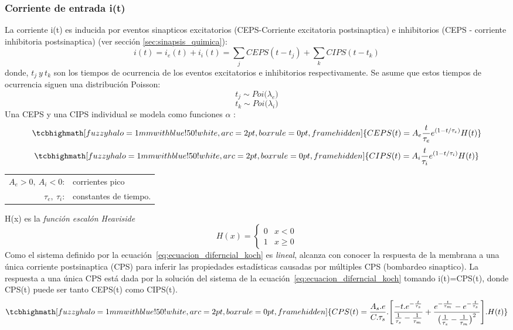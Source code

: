 \subsubsection{Corriente de entrada i(t)}
La corriente i(t) es inducida por eventos sinapticos excitatorios (CEPS-Corriente excitatoria postsinaptica) e inhibitorios (CEPS - corriente inhibitoria postsinaptica) (ver sección \ref{sec:sinapsis_quimica}):
\begin{equation}
    i(t)= i_e(t) + i_i(t)=\sum_j CEPS(t-t_j) + \sum_k CIPS(t-t_k)
\end{equation}
donde, $t_j\ y\ t_k$ son los tiempos de ocurrencia de los eventos excitatorios e inhibitorios respectivamente. Se asume que estos tiempos de ocurrencia siguen una distribución Poisson:
\[t_j\sim Poi\big(\lambda_e\big) \]
\[t_k\sim Poi\big(\lambda_i\big) \]
Una CEPS y una CIPS individual se modela como funciones $\alpha$ \cite{10.5555/1137840}:
\[
    \tcbhighmath[fuzzy halo=1mm with blue!50!white,arc=2pt,
  boxrule=0pt,frame hidden]{CEPS(t)=A_e \frac{t}{\tau_e}e^{(1-t/\tau_e)}H(t)}
\]
\[
    \tcbhighmath[fuzzy halo=1mm with blue!50!white,arc=2pt,
  boxrule=0pt,frame hidden]{CIPS(t)=A_i \frac{t}{\tau_i}e^{(1-t/\tau_i)}H(t)}
\]
\begin{center}
\begin{tabular}{ r l}
 $A_e>0,\ A_i<0$:& corrientes pico\\ 
 $\tau_e,\ \tau_i$:& constantes de tiempo.
\end{tabular}
\end{center}
H(x) es la \textit{función escalón Heaviside}
\begin{equation}\label{eq:heaviside}
    H(x)= \begin{cases} 
      0 & x< 0 \\
      1 & x \geq 0 
   \end{cases}
\end{equation}
Como el sistema definido por la ecuación~\ref{eq:ecuacion_diferncial_koch} es \textit{lineal}, alcanza con conocer la respuesta de la membrana a una única corriente postsinaptica (CPS) para inferir las propiedades estadísticas causadas por múltiples CPS (bombardeo sinaptico). La respuesta a una única CPS está dada por la solución del sistema de la ecuación~\ref{eq:ecuacion_diferncial_koch} tomando i(t)=CPS(t), donde CPS(t) puede ser tanto CEPS(t) como CIPS(t).
\[
    \tcbhighmath[fuzzy halo=1mm with blue!50!white,arc=2pt,
  boxrule=0pt,frame hidden]{CPS(t)=\frac{A_s.e}{C.\tau_s}.\Bigg[\frac{-t.e^{-\frac{t}{\tau_s}}}{\frac{1}{\tau_s}-\frac{1}{\tau_m}}+\frac{e^{-\frac{t}{\tau_m}}-e^{-\frac{t}{\tau_s}}}{\big(\frac{1}{\tau_s}-\frac{1}{\tau_m}\big)^2}\Bigg].H(t)}
\]
